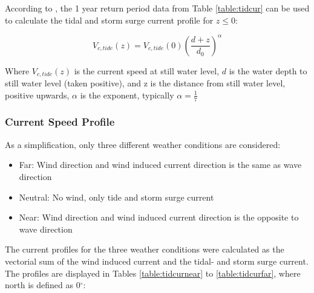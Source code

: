 \noindent According to \cite{dnvenviroment}, the 1 year return period data from Table \ref{table:tidcur} can be used to calculate the tidal and storm surge current profile for $z \leq 0$:

 \begin{equation}
      V_{c,tide}(z)= V_{c,tide}(0) \left( \frac{d+z}{d_0}\right)^{\alpha}
  \end{equation}
  
  \noindent Where $ V_{c,tide}(z)$ is the current speed at still water level, $d$ is the water depth to still water level (taken positive), and z is the distance from still water level, positive upwards, $\alpha$ is the exponent, typically $\alpha = \frac{1}{7}$

   \subsubsection{Current Speed Profile}
  As a simplification, only three different weather conditions are considered: 
  \begin{itemize}
      \item Far: Wind direction and wind induced current direction is the same as wave direction
     \item Neutral: No wind, only tide and storm surge current
     \item Near:  Wind direction and wind induced current direction is the opposite to wave direction
  \end{itemize}
 The current profiles for the three weather conditions were calculated as the vectorial sum of the wind induced current and the tidal- and storm surge current. The profiles are displayed in Tables \ref{table:tidcurnear} to \ref{table:tidcurfar}, where north is defined as 0$^{\circ}$:  

